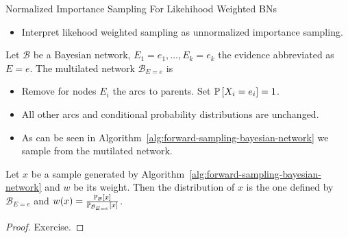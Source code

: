 \begin{frame}{Normalized Importance Sampling For Likehihood Weighted BNs}
\begin{itemize}
\item Interpret likehood weighted sampling as unnormalized importance sampling.
\end{itemize}
\pause
\begin{definition}
    Let $\mathcal{B}$ be a Bayesian network, $E_1 = e_1,\ldots, E_k = e_k$ the evidence abbreviated as $E = e$. The multilated network $\mathcal{B}_{E=e}$ is 
    \begin{itemize}
        \pause \item Remove for nodes $E_i$ the arcs to parents. Set $\Pb[X_i = e_i] = 1$. 
        \pause \item All other arcs and conditional probability distributions are unchanged.
    \end{itemize}
\end{definition}
\pause
\begin{itemize}
    \item As can be seen in Algorithm~\ref{alg:forward-sampling-bayesian-network} we sample from the mutilated network.
\end{itemize}
\pause
\begin{proposition}
    Let $x$ be a sample generated by Algorithm~\ref{alg:forward-sampling-bayesian-network} and $w$ be its weight. Then the distribution of $x$ is the one defined by $\mathcal{B}_{E=e}$ and $w(x) = \frac{\Pb_{\mathcal{B}}[x]}{\Pb_{\mathcal{B}_{E = e}}[x]}$.
\end{proposition}
\pause
\begin{proof}
Exercise.
\end{proof}
\end{frame}

